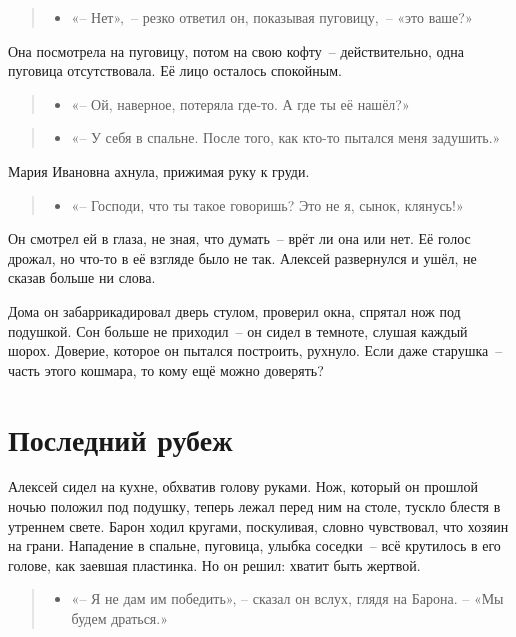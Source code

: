 \documentclass[12pt,a4paper]{book}
\newenvironment{dialogue}{\begin{quote}\itshape\begin{itemize}\item[]}{\end{itemize}\end{quote}}
\begin{document}
\begin{dialogue}
«-- Нет»,~-- резко ответил он, показывая пуговицу,~-- «это ваше?»
\end{dialogue}

Она посмотрела на пуговицу, потом на свою кофту~-- действительно, одна пуговица отсутствовала. Её лицо осталось спокойным.

\begin{dialogue}
«-- Ой, наверное, потеряла где-то. А где ты её нашёл?»
\end{dialogue}

\begin{dialogue}
«-- У себя в спальне. После того, как кто-то пытался меня задушить.»
\end{dialogue}

Мария Ивановна ахнула, прижимая руку к груди.

\begin{dialogue}
«-- Господи, что ты такое говоришь? Это не я, сынок, клянусь!»
\end{dialogue}

Он смотрел ей в глаза, не зная, что думать~-- врёт ли она или нет. Её голос дрожал, но что-то в её взгляде было не так. Алексей развернулся и ушёл, не сказав больше ни слова.

Дома он забаррикадировал дверь стулом, проверил окна, спрятал нож под подушкой. Сон больше не приходил~-- он сидел в темноте, слушая каждый шорох. Доверие, которое он пытался построить, рухнуло. Если даже старушка~-- часть этого кошмара, то кому ещё можно доверять?

\chapter{Последний рубеж}

Алексей сидел на кухне, обхватив голову руками. Нож, который он прошлой ночью положил под подушку, теперь лежал перед ним на столе, тускло блестя в утреннем свете. Барон ходил кругами, поскуливая, словно чувствовал, что хозяин на грани. Нападение в спальне, пуговица, улыбка соседки~-- всё крутилось в его голове, как заевшая пластинка. Но он решил: хватит быть жертвой.

\begin{dialogue}
    «-- Я не дам им победить», -- сказал он вслух, глядя на Барона. -- «Мы будем драться.»
\end{dialogue}
\end{document}
